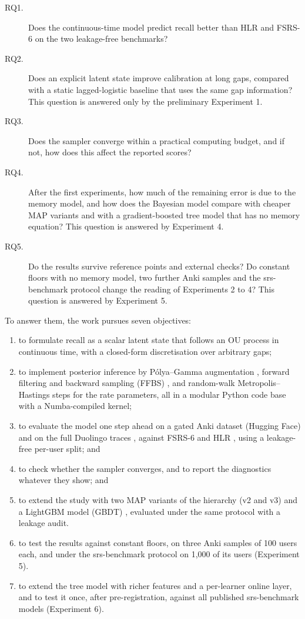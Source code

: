 \begin{description}
  \item[RQ1.] Does the continuous-time model predict recall better than HLR and FSRS-6 on the two leakage-free benchmarks?
  \item[RQ2.] Does an explicit latent state improve calibration at long gaps, compared with a static
    lagged-logistic baseline that uses the same gap information? This question is answered only by the
    preliminary Experiment 1.
  \item[RQ3.] Does the sampler converge within a practical computing budget, and if not, how does
    this affect the reported scores?
  \item[RQ4.] After the first experiments, how much of the remaining error is due to the memory model, and how does
    the Bayesian model compare with cheaper MAP variants and with a gradient-boosted tree model that has no memory equation?
    This question is answered by Experiment 4.
  \item[RQ5.] Do the results survive reference points and external checks? Do constant floors with no memory model, two further Anki samples and the srs-benchmark protocol change the reading of Experiments 2 to 4? This question is answered by Experiment 5.
\end{description}

To answer them, the work pursues seven objectives:

\begin{enumerate}
  \item to formulate recall as a scalar latent state that follows an OU process in continuous time,
    with a closed-form discretisation over arbitrary gaps;
  \item to implement posterior inference by P\'olya--Gamma augmentation \cite{polson2013pg}, forward
    filtering and backward sampling (FFBS) \cite{carter1994gibbs,fruhwirth1994data}, and random-walk
    Metropolis--Hastings steps for the rate parameters, all in a modular Python code base with a
    Numba-compiled kernel;
  \item to evaluate the model one step ahead on a gated Anki dataset (Hugging Face) \cite{ankirevlogs10k} and on the full Duolingo traces \cite{settles2016trainable}, against
    FSRS-6 \cite{pyfsrs,ye2022stochastic} and HLR \cite{settles2016trainable}, using a leakage-free
    per-user split; and
  \item to check whether the sampler converges, and to report the diagnostics whatever they show; and
  \item to extend the study with two MAP variants of the hierarchy (v2 and v3) and a LightGBM model (GBDT) \cite{ke2017lightgbm}, evaluated under the same protocol with a leakage audit.
  \item to test the results against constant floors, on three Anki samples of 100 users each, and under the srs-benchmark protocol on 1,000 of its users (Experiment 5).
  \item to extend the tree model with richer features and a per-learner online layer, and to test it once, after pre-registration, against all published srs-benchmark models (Experiment 6).
\end{enumerate}

